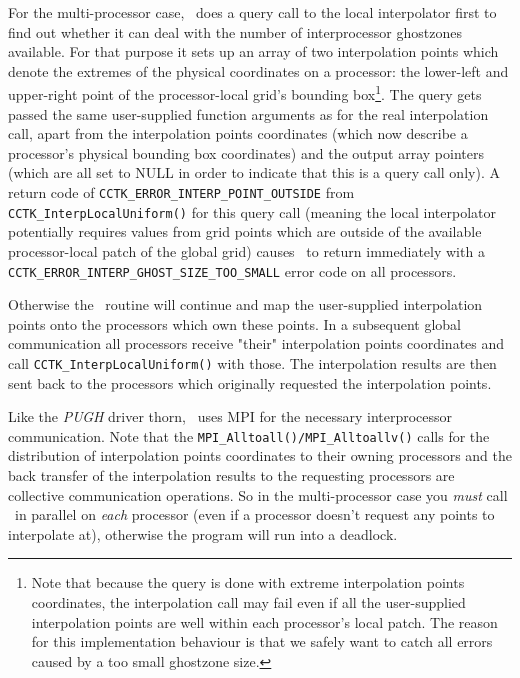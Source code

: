\documentclass{article}
\begin{document}
For the multi-processor case, \PUGHInterp\ does a query call to the local
interpolator first to find out whether it can deal with the number of
interprocessor ghostzones available. For that purpose it sets up an array of
two interpolation points which denote the extremes of the physical coordinates
on a processor: the lower-left and upper-right point of the processor-local
grid's bounding box\footnote{
Note that because the query is done with extreme interpolation points
coordinates, the interpolation call may fail even if all the user-supplied
interpolation points are well within each processor's local patch.
The reason for this implementation behaviour is that we safely want to catch
all errors caused by a too small ghostzone size.}.
The query gets passed the same user-supplied function arguments as for the
real interpolation call, apart from the interpolation points coordinates (which
now describe a processor's physical bounding box coordinates) and the output
array pointers (which are all set to NULL in order to indicate that this is a
query call only). A return code of \verb|CCTK_ERROR_INTERP_POINT_OUTSIDE|
from \verb|CCTK_InterpLocalUniform()| for this query call (meaning the local interpolator potentially requires values
from grid points which are outside of the available processor-local patch of
the global grid) causes \InterpGridArrays\ to return immediately with
a \verb|CCTK_ERROR_INTERP_GHOST_SIZE_TOO_SMALL| error code on all processors.

Otherwise the \InterpGridArrays\ routine will continue and map the user-supplied
interpolation points onto the processors which own these points. In a subsequent
global communication all processors receive "their" interpolation points
coordinates and call {\tt CCTK\_InterpLocalUniform()} with those. The
interpolation results are then sent back to the processors which originally
requested the interpolation points.

Like the {\it PUGH} driver thorn, \PUGHInterp\ uses MPI for the necessary
interprocessor communication. Note that the {\tt MPI\_Alltoall()/MPI\_Alltoallv()} calls for the
distribution of interpolation points coordinates to their owning processors and
the back transfer of the interpolation results to the requesting processors
are collective communication operations. So in the multi-processor case you
{\em must\/} call \InterpGridArrays\ in parallel on {\em each\/} processor
(even if a processor doesn't request any points to interpolate at), otherwise
the program will run into a deadlock.
\end{document}
